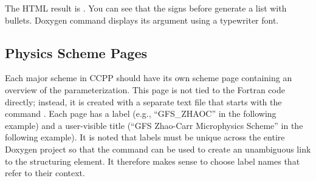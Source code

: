 \documentclass[letterpaper,10pt,english]{sphinxmanual}
\begin{document}
\begin{sphinxVerbatim}[commandchars=\\\{\}]
\end{sphinxVerbatim}

The HTML result is .
You can see that the  signs before  generate a list with bullets.
Doxygen command  displays its argument using a typewriter font.


\subsection{Physics Scheme Pages}
\label{\detokenize{ScientificDocRules:physics-scheme-pages}}
Each major scheme in CCPP should have its own scheme page containing an
overview of the parameterization.  This page is not tied to the Fortran
code directly; instead, it is created with a separate text file that starts
with the command .  Each page has a label (e.g., “GFS\_ZHAOC” in
the following example) and a user-visible title (“GFS Zhao-Carr Microphysics
Scheme” in the following example). It is noted that labels must be unique
across the entire Doxygen project so that the  command can be used
to create an unambiguous link to the structuring element. It therefore makes
sense to choose label names that refer to their context.
\end{document}
